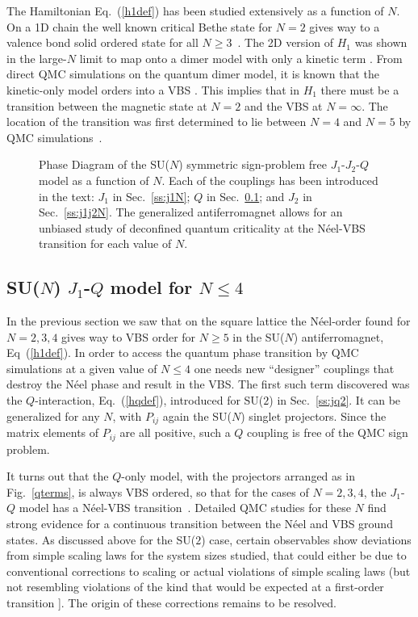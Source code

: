 \documentclass[range]{ar2e}
\begin{document}
The Hamiltonian Eq.~(\ref{h1def})
has been studied extensively as a function of $N$. On a 1D chain the well known critical Bethe state for $N=2$ gives way to a 
valence bond solid ordered state for all $N\geq 3$~\cite{barber1989:d1n3_vbs,klumper1989:d1n3_vbs,affleck1985:lgN}. The 2D version of $H_{1}$ was shown 
in the large-$N$ limit to map onto a dimer model with only a kinetic term \cite{read1989:nucphysB}. From direct QMC simulations on the quantum dimer model, 
it is known that the kinetic-only model orders into a VBS \cite{sachdev1989:qd_vbs}.  This implies that in $H_{1}$ there must be a transition between the 
magnetic state at $N=2$ and the VBS at $N=\infty$.  The location of the transition was first determined to lie between $N=4$ and $N=5$ 
by QMC simulations~\cite{harada2003:sun}.


\begin{figure}
\centerline{}
  \caption{ \label{fig:pdj1j2q} Phase Diagram of the
    SU($N$) symmetric sign-problem free
    $J_1$-$J_2$-$Q$ model as a function of $N$. Each of the couplings has been introduced
    in the text: $J_1$ in Sec.~\ref{ss:j1N}; $Q$ in Sec.~\ref{ss:jqN};
  and $J_2$ in Sec.~\ref{ss:j1j2N}. The generalized antiferromagnet
  allows for an unbiased study of deconfined quantum
  criticality at the N\'eel-VBS transition for each value of $N$. }
\end{figure}


\subsection{SU($N$) $J_1$-$Q$ model for $N\leq 4$}
\label{ss:jqN}
In the previous section we saw that on the square lattice the N\'eel-order found for $N=2,3,4$ gives way to VBS
order for $N\geq 5$ in the SU($N$) antiferromagnet, Eq~(\ref{h1def}). In order to access the quantum phase transition by QMC simulations at a 
given value of $N\leq 4$ one needs new ``designer'' couplings that destroy the N\'eel phase and result in the VBS. The first such term discovered 
was the $Q$-interaction, Eq.~(\ref{hqdef}), introduced for SU($2$) in Sec.~\ref{ss:jq2}. It can be generalized for any $N$, with $P_{ij}$ again 
the SU($N$) singlet projectors. Since the matrix elements of $P_{ij}$ are all positive, such a $Q$ coupling is free of the QMC sign problem. 

It turns out that the $Q$-only model, with the projectors arranged as in Fig.~\ref{qterms}, is always VBS ordered, so that for the cases of $N=2,3,4$, 
the $J_1$-$Q$ model has a N\'eel-VBS transition~\cite{Sandvik07,lou2009:sun}. Detailed QMC studies for these $N$ find strong evidence for a 
continuous transition between the N\'eel and VBS ground states\cite{melko2008:jq,kaul2011:su34,banerjee2010:log,banerjee2010:su3}. 
As discussed above for the SU($2$) case, certain observables show deviations from simple scaling laws for the system sizes studied, that could either 
be due to conventional corrections to scaling or actual violations of simple scaling laws (but not resembling violations of the kind that would be 
expected at a first-order transition \cite{Sandvik10c}]. The origin of these corrections remains to be resolved.
\end{document}
